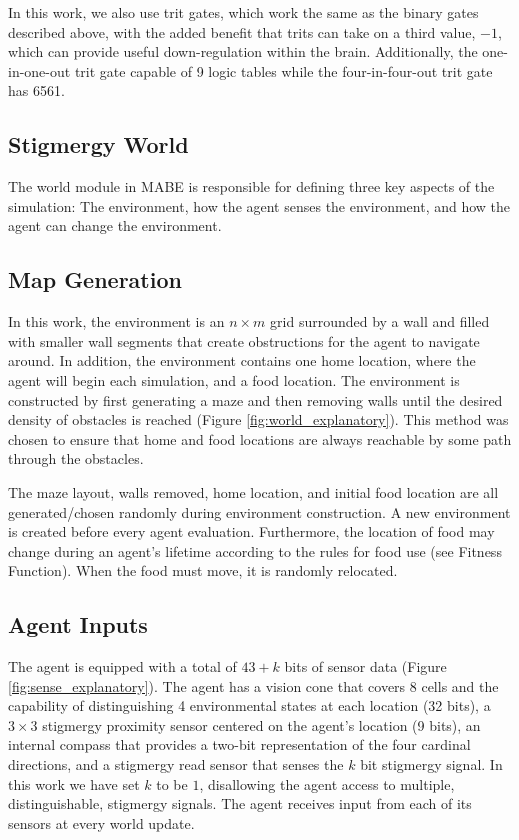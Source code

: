 In this work, we also use trit gates, which work the same as the binary gates described above, with the added benefit that trits can take on a third value, $-1$, which can provide useful down-regulation within the brain. Additionally, the one-in-one-out trit gate capable of 9 logic tables while the four-in-four-out trit gate has 6561.

\subsection {Stigmergy World} \label{world}

The world module in MABE is responsible for defining three key aspects of the simulation: The environment, how the agent senses the environment, and how the agent can change the environment.

\subsection*{Map Generation}

In this work, the environment is an $n\times m$ grid surrounded by a wall and filled with smaller wall segments that create obstructions for the agent to navigate around. In addition, the environment contains one home location, where the agent will begin each simulation, and a food location. The environment is constructed by first generating a maze and then removing walls until the desired density of obstacles is reached (Figure \ref{fig:world_explanatory}). This method was chosen to ensure that home and food locations are always reachable by some path through the obstacles.



The maze layout, walls removed, home location, and initial food location are all generated/chosen randomly during environment construction. A new environment is created before every agent evaluation. Furthermore, the location of food may change during an agent's lifetime according to the rules for food use (see Fitness Function). When the food must move, it is randomly relocated.

\subsection*{Agent Inputs}

The agent is equipped with a total of $43+k$ bits of sensor data (Figure \ref{fig:sense_explanatory}). The agent has a vision cone that covers 8 cells and the capability of distinguishing 4 environmental states at each location (32 bits), a $3\times 3$ stigmergy proximity sensor centered on the agent's location (9 bits), an internal compass that provides a two-bit representation of the four cardinal directions, and a stigmergy read sensor that senses the $k$ bit stigmergy signal. In this work we have set $k$ to be $1$, disallowing the agent access to multiple, distinguishable, stigmergy signals. The agent receives input from each of its sensors at every world update.

